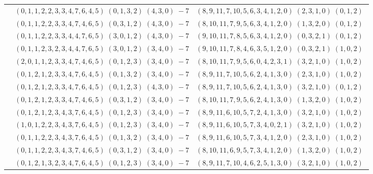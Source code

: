 \documentclass[11pt]{article}
\begin{document}
\begin{longtable}[l]{|c|c|c|}
 \cline{2-3} 
 & $(0 ,1 ,1 ,2 ,2 ,3 ,3 ,4 ,7 ,6 ,4 ,5) \;(0 ,1 ,3 ,2) \;(4 ,3 ,0) \;-7$ & $(8 ,9 ,11 ,7 ,10 ,5 ,6 ,3 ,4 ,1 ,2 ,0) \;(2 ,3 ,1 ,0) \;(0 ,1 ,2) \;$\\ 
 \cline{2-3} 
 & $(0 ,1 ,1 ,2 ,2 ,3 ,3 ,4 ,7 ,4 ,6 ,5) \;(0 ,3 ,1 ,2) \;(4 ,3 ,0) \;-7$ & $(8 ,10 ,11 ,7 ,9 ,5 ,6 ,3 ,4 ,1 ,2 ,0) \;(1 ,3 ,2 ,0) \;(0 ,1 ,2) \;$\\ 
 \cline{2-3} 
 & $(0 ,1 ,1 ,2 ,2 ,3 ,3 ,4 ,4 ,7 ,6 ,5) \;(3 ,0 ,1 ,2) \;(4 ,3 ,0) \;-7$ & $(9 ,10 ,11 ,7 ,8 ,5 ,6 ,3 ,4 ,1 ,2 ,0) \;(0 ,3 ,2 ,1) \;(0 ,1 ,2) \;$\\ 
 \cline{2-3} 
 & $(0 ,1 ,1 ,2 ,3 ,2 ,3 ,4 ,4 ,7 ,6 ,5) \;(3 ,0 ,1 ,2) \;(3 ,4 ,0) \;-7$ & $(9 ,10 ,11 ,7 ,8 ,4 ,6 ,3 ,5 ,1 ,2 ,0) \;(0 ,3 ,2 ,1) \;(1 ,0 ,2) \;$\\ 
 \cline{2-3} 
 & $(2 ,0 ,1 ,1 ,2 ,3 ,3 ,4 ,7 ,4 ,6 ,5) \;(0 ,1 ,2 ,3) \;(3 ,4 ,0) \;-7$ & $(8 ,10 ,11 ,7 ,9 ,5 ,6 ,0 ,4 ,2 ,3 ,1) \;(3 ,2 ,1 ,0) \;(1 ,0 ,2) \;$\\ 
 \cline{2-3} 
 & $(0 ,1 ,2 ,1 ,2 ,3 ,3 ,4 ,7 ,6 ,4 ,5) \;(0 ,1 ,3 ,2) \;(3 ,4 ,0) \;-7$ & $(8 ,9 ,11 ,7 ,10 ,5 ,6 ,2 ,4 ,1 ,3 ,0) \;(2 ,3 ,1 ,0) \;(1 ,0 ,2) \;$\\ 
 \cline{2-3} 
 & $(0 ,1 ,2 ,1 ,2 ,3 ,3 ,4 ,7 ,6 ,4 ,5) \;(0 ,1 ,2 ,3) \;(4 ,3 ,0) \;-7$ & $(8 ,9 ,11 ,7 ,10 ,5 ,6 ,2 ,4 ,1 ,3 ,0) \;(3 ,2 ,1 ,0) \;(0 ,1 ,2) \;$\\ 
 \cline{2-3} 
 & $(0 ,1 ,2 ,1 ,2 ,3 ,3 ,4 ,7 ,4 ,6 ,5) \;(0 ,3 ,1 ,2) \;(3 ,4 ,0) \;-7$ & $(8 ,10 ,11 ,7 ,9 ,5 ,6 ,2 ,4 ,1 ,3 ,0) \;(1 ,3 ,2 ,0) \;(1 ,0 ,2) \;$\\ 
 \cline{2-3} 
 & $(0 ,1 ,2 ,1 ,2 ,3 ,4 ,3 ,7 ,6 ,4 ,5) \;(0 ,1 ,2 ,3) \;(3 ,4 ,0) \;-7$ & $(8 ,9 ,11 ,6 ,10 ,5 ,7 ,2 ,4 ,1 ,3 ,0) \;(3 ,2 ,1 ,0) \;(1 ,0 ,2) \;$\\ 
 \cline{2-3} 
 & $(1 ,0 ,1 ,2 ,2 ,3 ,4 ,3 ,7 ,6 ,4 ,5) \;(0 ,1 ,2 ,3) \;(3 ,4 ,0) \;-7$ & $(8 ,9 ,11 ,6 ,10 ,5 ,7 ,3 ,4 ,0 ,2 ,1) \;(3 ,2 ,1 ,0) \;(1 ,0 ,2) \;$\\ 
 \cline{2-3} 
 & $(0 ,1 ,1 ,2 ,2 ,3 ,4 ,3 ,7 ,6 ,4 ,5) \;(0 ,1 ,3 ,2) \;(3 ,4 ,0) \;-7$ & $(8 ,9 ,11 ,6 ,10 ,5 ,7 ,3 ,4 ,1 ,2 ,0) \;(2 ,3 ,1 ,0) \;(1 ,0 ,2) \;$\\ 
 \cline{2-3} 
 & $(0 ,1 ,1 ,2 ,2 ,3 ,4 ,3 ,7 ,4 ,6 ,5) \;(0 ,3 ,1 ,2) \;(3 ,4 ,0) \;-7$ & $(8 ,10 ,11 ,6 ,9 ,5 ,7 ,3 ,4 ,1 ,2 ,0) \;(1 ,3 ,2 ,0) \;(1 ,0 ,2) \;$\\ 
 \cline{2-3} 
 & $(0 ,1 ,2 ,1 ,3 ,2 ,3 ,4 ,7 ,6 ,4 ,5) \;(0 ,1 ,2 ,3) \;(3 ,4 ,0) \;-7$ & $(8 ,9 ,11 ,7 ,10 ,4 ,6 ,2 ,5 ,1 ,3 ,0) \;(3 ,2 ,1 ,0) \;(1 ,0 ,2) \;$\\ 

\end{longtable}
\end{document}
